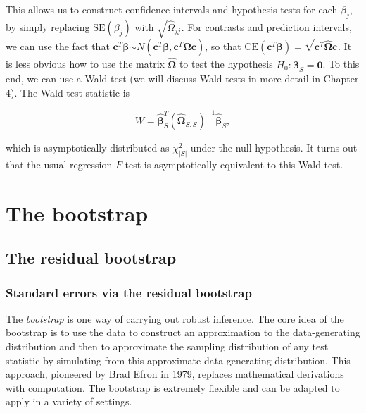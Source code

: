 \documentclass[
  11pt,
  letterpaper,
  oneside]{book}
\theoremstyle{definition}
\theoremstyle{plain}
\theoremstyle{plain}
\theoremstyle{plain}
\theoremstyle{remark}
\begin{document}
This allows us to construct confidence intervals and hypothesis tests
for each \(\beta_j\), by simply replacing \(\text{SE}(\beta_j)\) with
\(\sqrt{\widehat{\Omega}_{jj}}\). For contrasts and prediction
intervals, we can use the fact that
\(\boldsymbol{c}^T \boldsymbol{\beta} \overset{\cdot}{\sim} N(\boldsymbol{c}^T \boldsymbol{\beta}, \boldsymbol{c}^T \widehat{\boldsymbol{\Omega}} \boldsymbol{c})\),
so that
\(\text{CE}(\boldsymbol{c}^T \boldsymbol{\beta}) = \sqrt{\boldsymbol{c}^T \widehat{\boldsymbol{\Omega}} \boldsymbol{c}}\).
It is less obvious how to use the matrix
\(\widehat{\boldsymbol{\Omega}}\) to test the hypothesis
\(H_0: \boldsymbol{\beta}_S = \boldsymbol{0}\). To this end, we can use
a Wald test (we will discuss Wald tests in more detail in Chapter 4).
The Wald test statistic is

\[
W = \boldsymbol{\widehat{\beta}}_S^T (\widehat{\boldsymbol{\Omega}}_{S, S})^{-1} \boldsymbol{\widehat{\beta}}_S,
\]

which is asymptotically distributed as \(\chi^2_{|S|}\) under the null
hypothesis. It turns out that the usual regression \(F\)-test is
asymptotically equivalent to this Wald test.

\hypertarget{sec-bootstrap}{%
\chapter{The bootstrap}\label{sec-bootstrap}}

\hypertarget{sec-residual-bootstrap}{%
\section{The residual bootstrap}\label{sec-residual-bootstrap}}

\hypertarget{standard-errors-via-the-residual-bootstrap}{%
\subsection{Standard errors via the residual
bootstrap}\label{standard-errors-via-the-residual-bootstrap}}

The \emph{bootstrap} is one way of carrying out robust inference. The
core idea of the bootstrap is to use the data to construct an
approximation to the data-generating distribution and then to
approximate the sampling distribution of any test statistic by
simulating from this approximate data-generating distribution. This
approach, pioneered by Brad Efron in 1979, replaces mathematical
derivations with computation. The bootstrap is extremely flexible and
can be adapted to apply in a variety of settings.
\end{document}
